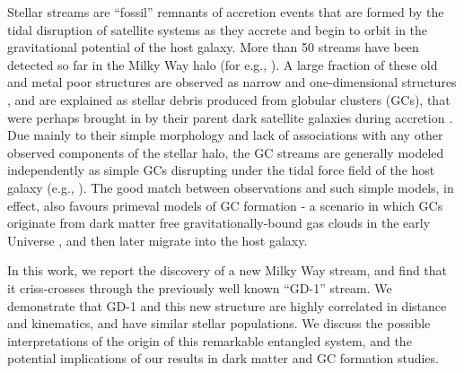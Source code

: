 \documentclass[apj]{emulateapj}
\begin{document}
Stellar streams are ``fossil'' remnants of accretion events that are formed by the tidal disruption of satellite systems as they accrete and begin to orbit in the gravitational potential of the host galaxy. More than 50 streams have been detected so far in the Milky Way halo (for e.g., \citealt{Ibata2001Sgr, Belokurov2006, Grillmair2009_fourStreams, Bernard2016, Balbinot2016Phoenix, Myeong2017_Streams, Shipp2018, Malhan_Ghostly_2018, Ibata_Norse_streams2019}). A large fraction of these old and metal poor structures are observed as narrow and one-dimensional structures \citep{GrillmairCarlin2016}, and are explained as stellar debris produced from globular clusters (GCs), that were perhaps brought in by their parent dark satellite galaxies during accretion \citep{Renaud2017}. Due mainly to their simple morphology and lack of associations with any other observed components of the stellar halo, the GC streams are generally modeled independently as simple GCs disrupting under the tidal force field of the host galaxy (e.g., \citealt{Dehnen2004}). The good match between observations and such simple models, in effect, also favours primeval models of GC formation - a scenario in which GCs originate from dark matter free gravitationally-bound gas clouds in the early Universe \citep{Kravtsov2005, Kruijssen2014}, and then later migrate into the host galaxy. 

In this work, we report the discovery of a new Milky Way stream, and find that it criss-crosses through the previously well known ``GD-1'' stream. We demonstrate that GD-1 and this new structure are highly correlated in distance and kinematics, and have similar stellar populations. 
We discuss the possible interpretations of the origin of this remarkable entangled system, and the potential implications of our results in dark matter and GC formation studies.
\end{document}
